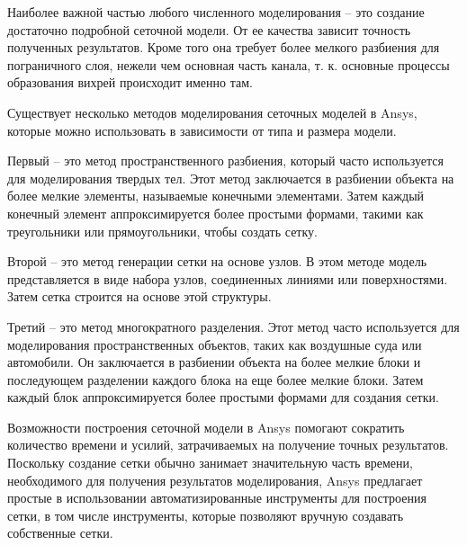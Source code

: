 	Наиболее важной частью любого численного моделирования -- это создание достаточно подробной сеточной модели. От ее качества зависит точность полученных результатов. Кроме того она требует более мелкого разбиения для пограничного слоя, нежели чем основная часть канала, т. к. основные процессы образования вихрей происходит именно там.
	
	Существует несколько методов моделирования сеточных моделей в Ansys, которые можно использовать в зависимости от типа и размера модели.
	
	Первый -- это метод пространственного разбиения, который часто используется для моделирования твердых тел. Этот метод заключается в разбиении объекта на более мелкие элементы, называемые конечными элементами. Затем каждый конечный элемент аппроксимируется более простыми формами, такими как треугольники или прямоугольники, чтобы создать сетку.
	
	Второй -- это метод генерации сетки на основе узлов. В этом методе модель представляется в виде набора узлов, соединенных линиями или поверхностями. Затем сетка строится на основе этой структуры.
	
	Третий -- это метод многократного разделения. Этот метод часто используется для моделирования пространственных объектов, таких как воздушные суда или автомобили. Он заключается в разбиении объекта на более мелкие блоки и последующем разделении каждого блока на еще более мелкие блоки. Затем каждый блок аппроксимируется более простыми формами для создания сетки.
	
	Возможности построения сеточной модели в Ansys помогают сократить количество времени и усилий, затрачиваемых на получение точных результатов. Поскольку создание сетки обычно занимает значительную часть времени, необходимого для получения результатов моделирования, Ansys предлагает простые в использовании автоматизированные инструменты для построения сетки, в том числе инструменты, которые позволяют вручную создавать собственные сетки.
	
